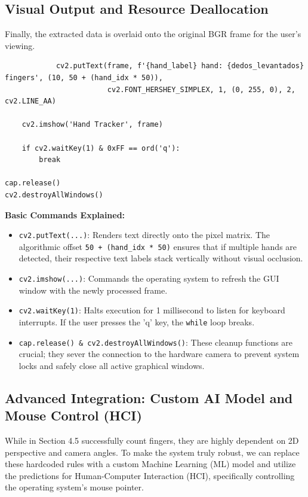 \subsection{Visual Output and Resource Deallocation}
\label{subsec:output}

Finally, the extracted data is overlaid onto the original BGR frame for the user's viewing.

\begin{lstlisting}
            cv2.putText(frame, f'{hand_label} hand: {dedos_levantados} fingers', (10, 50 + (hand_idx * 50)),
                        cv2.FONT_HERSHEY_SIMPLEX, 1, (0, 255, 0), 2, cv2.LINE_AA)

    cv2.imshow('Hand Tracker', frame)

    if cv2.waitKey(1) & 0xFF == ord('q'):
        break

cap.release()
cv2.destroyAllWindows()
\end{lstlisting}

\textbf{Basic Commands Explained:}
\begin{itemize}
    \item \texttt{cv2.putText(...)}: Renders text directly onto the pixel matrix. The algorithmic offset \texttt{50 + (hand\_idx * 50)} ensures that if multiple hands are detected, their respective text labels stack vertically without visual occlusion.
    \item \texttt{cv2.imshow(...)}: Commands the operating system to refresh the GUI window with the newly processed frame.
    \item \texttt{cv2.waitKey(1)}: Halts execution for 1 millisecond to listen for keyboard interrupts. If the user presses the 'q' key, the \texttt{while} loop breaks.
    \item \texttt{cap.release() \& cv2.destroyAllWindows()}: These cleanup functions are crucial; they sever the connection to the hardware camera to prevent system locks and safely close all active graphical windows.
\end{itemize}

\subsection{Advanced Integration: Custom AI Model and Mouse Control (HCI)}

While in Section 4.5 successfully count fingers, they are highly dependent on 2D perspective and camera angles. To make the system truly robust, we can replace these hardcoded rules with a custom Machine Learning (ML) model and utilize the predictions for Human-Computer Interaction (HCI), specifically controlling the operating system's mouse pointer.

